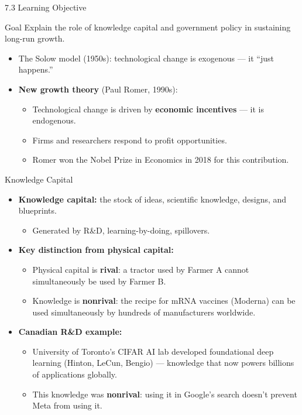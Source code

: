 \documentclass[aspectratio=169]{beamer}
\begin{document}
\begin{frame}{7.3 Learning Objective}
\transfade
\begin{block}{Goal}
Explain the role of knowledge capital and government policy in sustaining long-run growth.
\end{block}
\begin{itemize}[<+->]
  \item The Solow model (1950s): technological change is exogenous --- it ``just happens.''
  \item \textbf{New growth theory} (Paul Romer, 1990s):
  \begin{itemize}[<+->]
    \item Technological change is driven by \textbf{economic incentives} --- it is endogenous.
    \item Firms and researchers respond to profit opportunities.
    \item Romer won the \alert{Nobel Prize in Economics in 2018} for this contribution.
  \end{itemize}
\end{itemize}
\end{frame}

\begin{frame}{Knowledge Capital}
\transfade
\begin{itemize}[<+->]
  \item \textbf{Knowledge capital:} the stock of ideas, scientific knowledge, designs, and blueprints.
  \begin{itemize}[<+->]
    \item Generated by R\&D, learning-by-doing, spillovers.
  \end{itemize}
  \item \textbf{Key distinction from physical capital:}
  \begin{itemize}[<+->]
    \item Physical capital is \textbf{rival}: a tractor used by Farmer A cannot simultaneously be used by Farmer B.
    \item Knowledge is \textbf{nonrival}: the recipe for mRNA vaccines (Moderna) can be used simultaneously by hundreds of manufacturers worldwide.
  \end{itemize}
  \item \textbf{Canadian R\&D example:}
  \begin{itemize}[<+->]
    \item University of Toronto's CIFAR AI lab developed foundational deep learning (Hinton, LeCun, Bengio) --- knowledge that now powers billions of applications globally.
    \item This knowledge was \textbf{nonrival}: using it in Google's search doesn't prevent Meta from using it.
  \end{itemize}
\end{itemize}
\end{frame}
\end{document}
